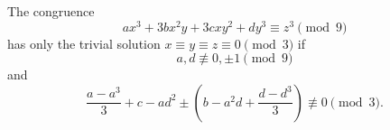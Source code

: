 \begin{proposition}
    The congruence
\[
    ax^3+3bx^2y+3cxy^2+dy^3\equiv z^3\pmod 9
\]
    has only the trivial solution $x\equiv y\equiv z\equiv0\pmod3$ if
\[
    a,d\not\equiv0,\pm1\pmod9
\]
    and
\[
    \frac{a-a^3}{3}+c-ad^2
    \pm\left(b-a^2d+\frac{d-d^3}{3}\right)
    \not\equiv0\pmod3.
\]
\end{proposition}
